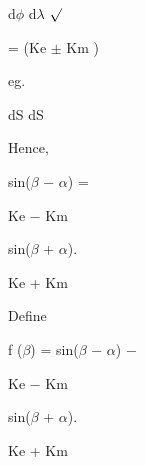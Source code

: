 \documentclass[a4paper,portrait,12pt]{article}
\begin{document}
\begin{flushleft}
d$\phi$ d$\lambda$ $\surd$
\end{flushleft}


\begin{flushleft}
= (Ke $\pm$ Km )
\end{flushleft}


\begin{flushleft}
eg.
\end{flushleft}


\begin{flushleft}
dS dS
\end{flushleft}


\begin{flushleft}
Hence,
\end{flushleft}


\begin{flushleft}
sin($\beta$ $-$ $\alpha$) =
\end{flushleft}





\begin{flushleft}
Ke $-$ Km
\end{flushleft}


\begin{flushleft}
sin($\beta$ + $\alpha$).
\end{flushleft}


\begin{flushleft}
Ke + Km
\end{flushleft}





\begin{flushleft}
Define
\end{flushleft}


\begin{flushleft}
f ($\beta$) = sin($\beta$ $-$ $\alpha$) $-$
\end{flushleft}





\begin{flushleft}
Ke $-$ Km
\end{flushleft}


\begin{flushleft}
sin($\beta$ + $\alpha$).
\end{flushleft}


\begin{flushleft}
Ke + Km
\end{flushleft}
\end{document}
